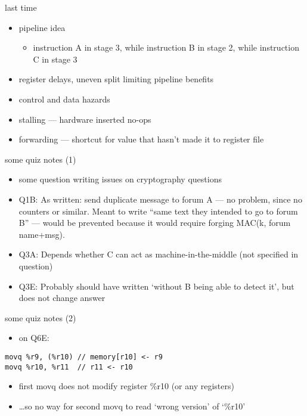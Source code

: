 \date{}
\title{}
\date{}

\begin{frame}
    \titlepage
\end{frame}


\usetikzlibrary{circuits.logic.mux,matrix}





\begin{frame}{last time}
    \begin{itemize}
    \item pipeline idea
        \begin{itemize}
        \item instruction A in stage 3, while instruction B in stage 2, while instruction C in stage 3
        \end{itemize}
    \item register delays, uneven split limiting pipeline benefits
    \item control and data hazards
    \item stalling --- hardware inserted no-ops
    \item forwarding --- shortcut for value that hasn't made it to register file
    \end{itemize}
\end{frame}

\begin{frame}{some quiz notes (1)}
    \begin{itemize}
    \item some question writing issues on cryptography questions
    \vspace{.5cm}
    \item Q1B: As written: send duplicate message to forum A --- no problem, since no counters or similar. Meant to write ``same text they intended to go to forum B'' --- would be prevented because it would require forging MAC(k, forum name+msg).
    \item Q3A: Depends whether C can act as machine-in-the-middle (not specified in question)
    \item Q3E: Probably should have written `without B being able to detect it', but does not change answer
    \end{itemize}
\end{frame}

\begin{frame}[fragile]{some quiz notes (2)}
    \begin{itemize}
    \item on Q6E:
    \end{itemize}
\begin{Verbatim}
movq %r9, (%r10) // memory[r10] <- r9
movq %r10, %r11  // r11 <- r10
\end{Verbatim}
    \begin{itemize}
    \item first movq does not modify register \%r10 (or any registers)
    \item \ldots so no way for second movq to read `wrong version' of `\%r10'
    \end{itemize}
\end{frame}

